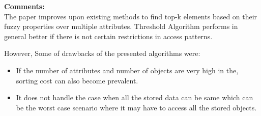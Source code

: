 \documentclass[a4paper,12pt, twoside]{article}
\begin{document}
\textbf{Comments:}\\
The paper improves upon existing methods to find top-k elements based on their fuzzy properties over multiple attributes. Threshold Algorithm performs in general better if there is not certain restrictions in access patterns.  

However, Some of drawbacks of the presented algorithms were:
\begin{itemize}
	\item If the number of attributes and number of objects are very high in the, sorting cost can also become prevalent. 	
	\item It does not handle the case when all the stored data can be same which can be the worst case scenario where it may have to access all the stored objects.
\end{itemize}
\end{document}
